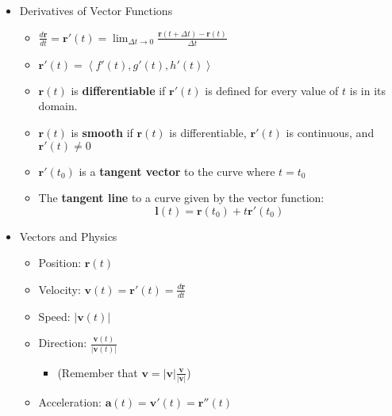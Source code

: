 \documentclass[12pt]{article}
\newcommand{\ds}{\displaystyle}
\renewcommand{\vec}[1]{\mathbf{#1}}
\newcommand{\<}{\left<}
\renewcommand{\>}{\right>}
\begin{document}
\begin{itemize}
    \item Derivatives of Vector Functions
      \begin{itemize}
        \item $\ds \frac{d\vec{r}}{dt} = \vec{r}'(t) = \lim_{\Delta t \to 0} \frac{\vec{r}(t+\Delta t) - \vec{r}(t)}{\Delta t}$
        \item $\vec{r}'(t) = \<f'(t),g'(t),h'(t)\>$
        \item $\vec{r}(t)$ is \textbf{differentiable} if $\vec{r}'(t)$ is defined for every value of $t$ is in its domain.
        \item $\vec{r}(t)$ is \textbf{smooth} if $\vec{r}(t)$ is differentiable, $\vec{r}'(t)$ is continuous, and $\vec{r}'(t) \not= 0$
        \item $\vec{r}'(t_0)$ is a \textbf{tangent vector} to the curve where $t=t_0$
        \item The \textbf{tangent line} to a curve given by the vector function: \[\vec{l}(t)=\vec{r}(t_0)+t\vec{r}'(t_0)\]
      \end{itemize}

    \item Vectors and Physics
      \begin{itemize}
      \item Position: $\vec{r}(t)$
      \item Velocity: $\vec{v}(t) = \vec{r}'(t) = \frac{d\vec{r}}{dt}$
      \item Speed: $|\vec{v}(t)|$ 
      \item Direction: $\frac{\vec{v}(t)}{|\vec{v}(t)|}$ 
        \begin{itemize}
          \item (Remember that $\vec{v}=|\vec{v}|\frac{\vec{v}}{|\vec{v}|}$)
        \end{itemize}
      \item Acceleration: $\vec{a}(t) = \vec{v}'(t) = \vec{r}''(t)$ 
      \end{itemize}
    

\end{itemize}
\end{document}
